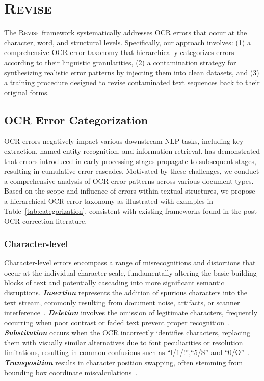 \section{\textsc{Revise}}


The \textsc{Revise} framework systematically addresses OCR errors that occur at the character, word, and structural levels. Specifically, our approach involves: (1) a comprehensive OCR error taxonomy that hierarchically categorizes errors according to their linguistic granularities, (2) a contamination strategy for synthesizing realistic error patterns by injecting them into clean datasets, and (3) a training procedure designed to revise contaminated text sequences back to their original forms.

\subsection{OCR Error Categorization}
\label{categorize}




OCR errors negatively impact various downstream NLP tasks, including key extraction, named entity recognition, and information retrieval. \citet{error_cascade} has demonstrated that errors introduced in early processing stages propagate to subsequent stages, resulting in cumulative error cascades.
Motivated by these challenges, we conduct a comprehensive analysis of OCR error patterns across various document types. Based on the scope and influence of errors within textual structures, we propose a hierarchical OCR error taxonomy as illustrated with examples in Table~\ref{tab:categorization}, consistent with existing frameworks found in the post-OCR correction literature. 



\subsubsection*{Character-level}
Character-level errors encompass a range of misrecognitions and distortions that occur at the individual character scale, fundamentally altering the basic building blocks of text and potentially cascading into more significant semantic disruptions. \textbf{\textit{Insertion}} represents the addition of spurious characters into the text stream, commonly resulting from document noise, artifacts, or scanner interference~\cite{afli-etal-2016-using, kashid2025roundtripocrdatagenerationtechnique}. \textbf{\textit{Deletion}} involves the omission of legitimate characters, frequently occurring when poor contrast or faded text prevent proper recognition~\cite{7991582}. \textbf{\textit{Substitution}} occurs when the OCR incorrectly identifies characters, replacing them with visually similar alternatives due to font peculiarities or resolution limitations, resulting in common confusions such as ``l/1/!'',``5/S'' and ``0/O''~\cite{artidigh20, essay102117}. \textbf{\textit{Transposition}} results in character position swapping, often stemming from bounding box coordinate miscalculations~\cite{suissa2023optimizingneuralnetworktraining}.


